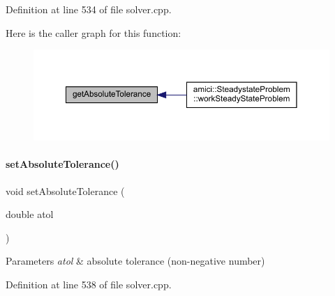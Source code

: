 Definition at line 534 of file solver.\+cpp.

Here is the caller graph for this function\+:
\nopagebreak
\begin{figure}[H]
\begin{center}
\leavevmode
\includegraphics[width=350pt]{classamici_1_1_solver_a676df944b6737474dd4ef74fe9212f3e_icgraph}
\end{center}
\end{figure}
\mbox{\label{classamici_1_1_solver_afe0fd2fad6ce110ad8421f5979945f90}} 
\paragraph{\texorpdfstring{set\+Absolute\+Tolerance()}{setAbsoluteTolerance()}}
{\footnotesize\ttfamily void set\+Absolute\+Tolerance (\begin{DoxyParamCaption}\item[{double}]{atol }\end{DoxyParamCaption})}


\begin{DoxyParams}{Parameters}
{\em atol} & absolute tolerance (non-\/negative number) \\
\hline
\end{DoxyParams}


Definition at line 538 of file solver.\+cpp.

